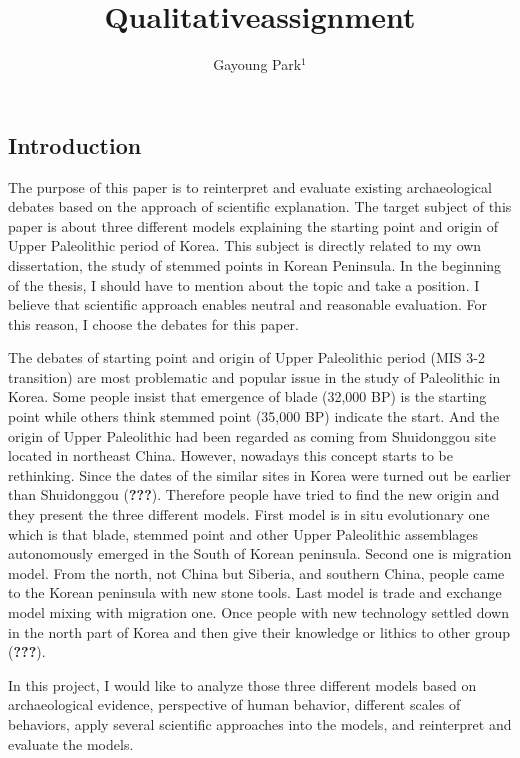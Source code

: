 \documentclass[american,man]{apa6}
\title{Qualitativeassignment}
\author{Gayoung Park\(^1\)}
\affiliation{\vspace{0.5cm}\(^1\)University of Washington}
\begin{document}
\maketitle

\subsection{Introduction}\label{introduction}

The purpose of this paper is to reinterpret and evaluate existing
archaeological debates based on the approach of scientific explanation.
The target subject of this paper is about three different models
explaining the starting point and origin of Upper Paleolithic period of
Korea. This subject is directly related to my own dissertation, the
study of stemmed points in Korean Peninsula. In the beginning of the
thesis, I should have to mention about the topic and take a position. I
believe that scientific approach enables neutral and reasonable
evaluation. For this reason, I choose the debates for this paper.

The debates of starting point and origin of Upper Paleolithic period
(MIS 3-2 transition) are most problematic and popular issue in the study
of Paleolithic in Korea. Some people insist that emergence of blade
(32,000 BP) is the starting point while others think stemmed point
(35,000 BP) indicate the start. And the origin of Upper Paleolithic had
been regarded as coming from Shuidonggou site located in northeast
China. However, nowadays this concept starts to be rethinking. Since the
dates of the similar sites in Korea were turned out be earlier than
Shuidonggou ({\textbf{???}}). Therefore people have tried to find the
new origin and they present the three different models. First model is
in situ evolutionary one which is that blade, stemmed point and other
Upper Paleolithic assemblages autonomously emerged in the South of
Korean peninsula. Second one is migration model. From the north, not
China but Siberia, and southern China, people came to the Korean
peninsula with new stone tools. Last model is trade and exchange model
mixing with migration one. Once people with new technology settled down
in the north part of Korea and then give their knowledge or lithics to
other group ({\textbf{???}}).

In this project, I would like to analyze those three different models
based on archaeological evidence, perspective of human behavior,
different scales of behaviors, apply several scientific approaches into
the models, and reinterpret and evaluate the models.
\end{document}
